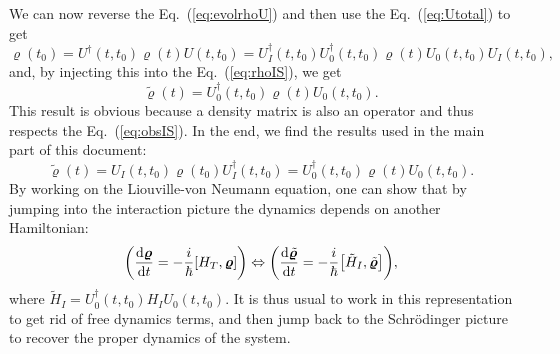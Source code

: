 We can now reverse the Eq.~(\ref{eq:evolrhoU}) and then use the Eq.~(\ref{eq:Utotal}) to get
\begin{equation*}
    \bm{\varrho}(t_0) = U^\dagger(t,t_0)\bm{\varrho}(t)U(t,t_0) = U_I^\dagger(t,t_0)U^\dagger_0(t,t_0)\bm{\varrho}(t)U_0(t,t_0)U_I(t,t_0),
\end{equation*}
and, by injecting this into the Eq.~(\ref{eq:rhoIS}), we get
\begin{equation}
    \tilde{\bm{\varrho}}(t) = U^\dagger_0(t,t_0)\bm{\varrho}(t)U_0(t,t_0).
\end{equation}
This result is obvious because a density matrix is also an operator and thus respects the Eq.~(\ref{eq:obsIS}).
In the end, we find the results used in the main part of this document:
\begin{equation}
    \boxed{\tilde{\bm{\varrho}}(t)=U_I(t,t_0)\bm{\varrho}(t_0)U_I^\dagger(t,t_0)= U^\dagger_0(t,t_0)\bm{\varrho}(t)U_0(t,t_0)}.
\end{equation}
By working on the Liouville-von Neumann equation, one can show that by jumping into the interaction picture the dynamics depends on another Hamiltonian:
\begin{equation}
    \qty(\frac{\mathrm{d}\bm{\varrho}}{\mathrm{d}t}=-\frac{i}{\hbar}\qty[H_T,\bm{\varrho}])\Leftrightarrow\qty(\frac{\mathrm{d}\tilde{\bm{\varrho}}}{\mathrm{d}t}=-\frac{i}{\hbar}\qty[\tilde{H}_I,\tilde{\bm{\varrho}}]),
\end{equation}
where $\tilde{H}_I=U_0^\dagger(t,t_0)H_I U_0(t,t_0)$. It is thus usual to work in this representation to get rid of free dynamics terms, and then jump back to the Schrödinger picture to recover the proper dynamics of the system.
